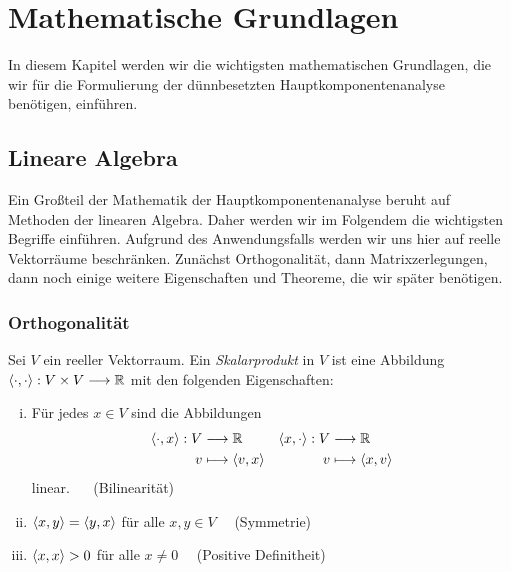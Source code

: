 \chapter{Mathematische Grundlagen}

\label{fundamentals}

In diesem Kapitel werden wir die wichtigsten mathematischen Grundlagen, die wir für die Formulierung der dünnbesetzten Hauptkomponentenanalyse benötigen, einführen. 






\section{Lineare Algebra}

Ein Großteil der Mathematik der Hauptkomponentenanalyse beruht auf Methoden der linearen Algebra. Daher werden wir im Folgendem die wichtigsten Begriffe einführen. Aufgrund des Anwendungsfalls werden wir uns hier auf reelle Vektorräume beschränken.
Zunächst Orthogonalität, dann Matrixzerlegungen, dann noch einige weitere Eigenschaften und Theoreme, die wir später benötigen.

\subsection{Orthogonalität}
\begin{defn}
Sei $V$ ein reeller Vektorraum. Ein \textit{Skalarprodukt} in $V$ ist eine Abbildung $\langle \cdot, \cdot \rangle: V \times V \longrightarrow \mathbb{R}$ mit den folgenden Eigenschaften:
\begin{enumerate}[(i)]
\item Für jedes $x \in V$ sind die Abbildungen
\begin{align*}
\langle \cdot, x \rangle: V & \longrightarrow \mathbb{R} & \langle x, \cdot \rangle: V & \longrightarrow \mathbb{R}\\
v & \longmapsto \langle v, x \rangle & v & \longmapsto \langle x, v \rangle
\end{align*}
linear. $\quad$ (Bilinearität)
\item $\langle x, y \rangle = \langle y, x \rangle$ für alle  $x,y \in V \quad$ (Symmetrie)
\item $\langle x, x \rangle > 0$ für alle $x \neq 0 \quad$ (Positive Definitheit)
\end{enumerate}
\end{defn}

